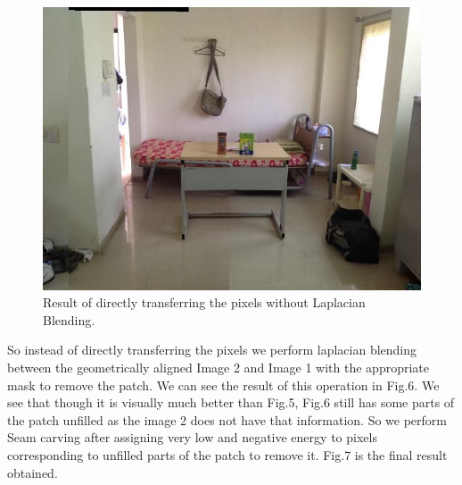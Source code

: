 \documentclass[conference]{IEEEtran}
\begin{document}
\begin{figure}
  \includegraphics[width=\linewidth]{wb.jpg}
  \caption{Result of directly transferring the pixels without Laplacian Blending.}
  \label{fig:i5}
\end{figure}
	So instead of directly transferring the pixels we perform laplacian blending between the geometrically aligned Image 2 and Image 1 with the appropriate mask to remove the patch. We can see the result of this operation in Fig.6. We see that though it is visually much better than Fig.5, Fig.6 still has some parts of the patch unfilled as the image 2 does not have that information. So we perform Seam carving after assigning very low and negative energy to pixels corresponding to unfilled parts of the patch to remove it. Fig.7 is the final result obtained. 
\end{document}
